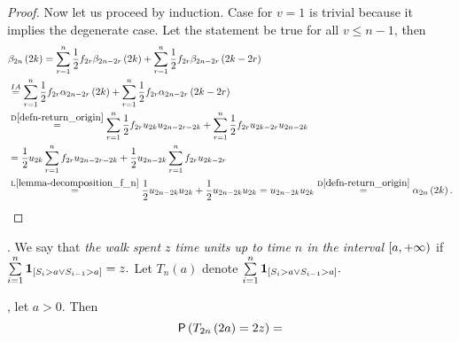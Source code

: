 \begin{proof}
 Now let us proceed by induction. Case for $v=1$ is trivial because it implies the degenerate case. Let the statement be true for all $v \leq n-1$, then
 \[
  \begin{split}
    &\beta_{2n}\left(2k\right)=\suma[r][1][n] \h f_{2r} \beta_{2n-2r}\left(2k\right)+\suma[r][1][n] \h f_{2r}\beta_{2n-2r}\left(2k-2r\right)\\
    & \induk \suma[r][1][n] \h f_{2r} \alpha_{2n-2r}\left(2k\right)+\suma[r][1][n] \h f_{2r}\alpha_{2n-2r}\left(2k-2r\right)\\
    & \overset{\text{D}\ref{defn-return_origin}}{=} \suma[r][1][n] \h f_{2r} u_{2k}u_{2n-2r-2k}+\suma[r][1][n] \h f_{2r} u_{2k-2r}u_{2n-2k}\\
    & = \h u_{2k} \suma[r][1][n] f_{2r} u_{2n-2r-2k}+ \h u_{2n-2k} \suma[r][1][n] f_{2r} u_{2k-2r}\\
    & \overset{\text{L}\ref{lemma-decomposition_f_n}}{=} \h u_{2n-2k} u_{2k} +\h u_{2n-2k} u_{2k}=u_{2n-2k} u_{2k}
   \overset{\text{D}\ref{defn-return_origin}}{=}\alpha_{2n}\left(2k\right).
  \end{split}
 \]
\end{proof}
\begin{comment}
\begin{defn}[Change of a sign]
 \Lrw. We say that \intime $n$ occurred a change of sign if if $S_{n-1}\cdot S_{n+1}=-1$ in other words if $\left(S_{n-1}=+1 \land S_{n+1}=-1\right) \lor \left(S_{n-1}=-1 \land S_{n+1}=+1\right).$
 We shall denote the probability that up to \Time $n$ occurred $r$ changes of sign by $\xi_{r, n}$.
\end{defn}
\begin{thm}[Change of a sign]
 \Lrws. The probability $\xi_{r,2n+1}=2\pr\left( S_{2n+1}=2r+1 \right)$
\end{thm}
\begin{proof}
 Feller
\end{proof}
\end{comment}
\begin{defn}
  \Lrw. We say that \emph{the walk spent $z$ time units up to time $n$ in the interval $\left[a,{+\infty} \right)$} if $\suma \indikator{S_i>a \lor S_{i-1}>a}=z.$
  Let $T_n\left(a\right)$ denote $\suma \indikator{S_i>a \lor S_{i-1}>a}.$
\end{defn}
\begin{thm}
  \Lrws, let $a>0.$ Then
  \[
  \operatorname{\mathsf{P}} \left(T_{2n} \left( 2a \right) = 2z \right)=
  \]
\end{thm}
